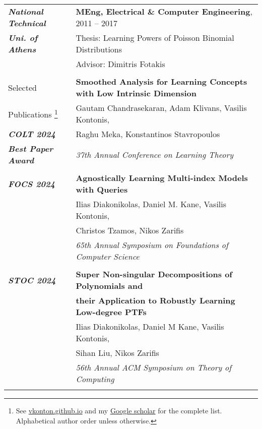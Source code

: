 \documentclass[letterpaper,11pt,oneside]{article}
\begin{document}
\begin{longtable}{@{} l l}
      \emph{\textbf{National Technical}}
     & \textbf{MEng, Electrical \& Computer Engineering}, 2011 -- 2017\\
     \emph{\textbf{Uni. of Athens} }
     & Thesis: Learning Powers of Poisson Binomial Distributions\\
     & Advisor: Dimitris Fotakis \\
     & \\


 \Large{Selected}  
 &\textbf{Smoothed Analysis for Learning Concepts with
 Low Intrinsic Dimension} \\
\Large{Publications \footnote{ 
See \href{https://vkonton.github.io}{vkonton.github.io} and
my \href{https://scholar.google.com/citations?user=7_44KWAAAAAJ&hl=el}{Google scholar} 
for the complete list.  
Alphabetical author order unless otherwise.
}}
 & Gautam Chandrasekaran, Adam Klivans, Vasilis Kontonis, \\
  \emph{\textbf{COLT 2024}} 
 & Raghu Meka, Konstantinos Stavropoulos \\
  \emph{\textbf{Best Paper Award}}
 & \emph{37th Annual Conference on Learning Theory} \\
 & \\

\emph{\textbf{FOCS 2024}}
 &\textbf{Agnostically Learning Multi-index Models with Queries}\\ 
 & Ilias Diakonikolas, Daniel M. Kane, Vasilis Kontonis,\\ 
 & Christos Tzamos, Nikos Zarifis \\ 
 & \emph{65th Annual Symposium on Foundations of Computer Science} \\ 
 & \\

 \emph{\textbf{STOC 2024}} 
 &\textbf{Super Non-singular Decompositions of Polynomials and}\\
 &\textbf{their Application to Robustly Learning Low-degree PTFs} \\
 & Ilias Diakonikolas, Daniel M Kane, Vasilis Kontonis, \\
 & Sihan Liu, Nikos Zarifis\\
 & \emph{56th Annual ACM Symposium on Theory of Computing}\\
 & \\




\end{longtable}
\end{document}
